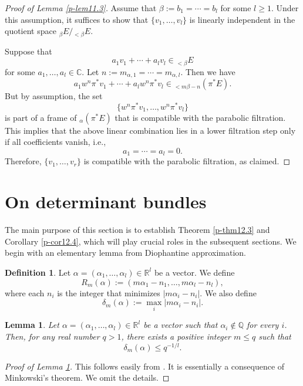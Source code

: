 \documentclass[12pt,twoside]{amsart}
\newtheorem{lem}[thm]{Lemma}
\theoremstyle{definition}
\newtheorem{defn}[thm]{Definition}
\begin{document}
\begin{proof}[Proof of Lemma \ref{p-lem11.3}]
Assume that $\beta := b_1 = \cdots = b_l$ for some $l \geq 1$. 
Under this assumption, it suffices to show 
that $\{v_1, \ldots, v_l\}$ is linearly 
independent in the quotient space ${}_\beta E / {}_{<\beta}E$. 

Suppose that 
\[
a_1 v_1 + \cdots + a_l v_l \in {}_{<\beta} E
\]
for some $a_1, \ldots, a_l \in \mathbb{C}$. 
Let $n := m_{\alpha,1} = \cdots = 
m_{\alpha,l}$. 
Then we have
\[
a_1 w^n \pi^*v_1 + \cdots + a_l w^n \pi^*v_l 
\in {}_{< m\beta - n} (\pi^*E).
\] 
But by assumption, the set 
\[
\{w^n \pi^*v_1, \ldots, w^n \pi^*v_l\}
\] 
is part of a frame of ${}_\alpha(\pi^*E)$ that is 
compatible with the parabolic filtration. 
This implies that the above linear combination 
lies in a lower filtration step only if all coefficients vanish, i.e., 
\[
a_1 = \cdots = a_l = 0.
\] 
Therefore, $\{v_1, \ldots, v_r\}$ is compatible with 
the parabolic filtration, as claimed.
\end{proof}

\section{On determinant bundles}\label{p-sec12}

The main purpose of this section is to establish 
Theorem \ref{p-thm12.3} and Corollary \ref{p-cor12.4}, 
which will play crucial roles in the subsequent sections.  
We begin with an elementary lemma from Diophantine approximation.

\begin{defn}\label{p-def12.1}
Let $\alpha = (\alpha_1, \dots, \alpha_l) \in \mathbb{R}^l$ be a vector.  
We define
\[
R_m(\alpha) := \left( m\alpha_1 - n_1, \dots, m\alpha_l - n_l \right),
\]
where each $n_i$ is the integer that minimizes $|m\alpha_i - n_i|$.  
We also define
\[
\delta_m(\alpha) := \max_i |m\alpha_i - n_i|.
\]
\end{defn}

\begin{lem}\label{p-lem12.2}
Let $\alpha = (\alpha_1, \dots, \alpha_l) 
\in \mathbb{R}^l$ be a vector such that $\alpha_i \notin \mathbb{Q}$ for every $i$.  
Then, for any real number $q > 1$, 
there exists a positive integer $m \leq q$ such that
\[
\delta_m(\alpha) \leq q^{-1/l}.
\]
\end{lem}

\begin{proof}[Proof of Lemma \ref{p-lem12.2}]
This follows easily from \cite[Chapter I, Theorem VI]{cas}.  
It is essentially a consequence of Minkowski's theorem.  
We omit the details.
\end{proof}
\end{document}
